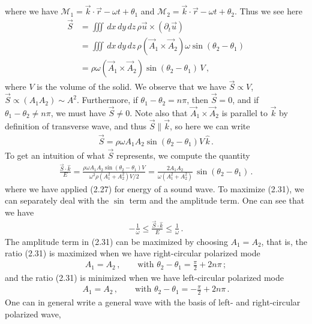 \documentclass[11pt, onesided]{book}
\theoremstyle{break}
\theoremstyle{break}
\newcommand{\pd}{\partial}
\begin{document}
where we have $\mathcal{M}_1 = \vec{k}\cdot \vec{r} - \omega t + \theta_1$ and $\mathcal{M}_2 = \vec{k}\cdot \vec{r} - \omega t + \theta_2$. Thus we see here
\begin{align*}
\vec{S} 
&= \iiint \, dx\,dy\,dz \, \rho \vec{u}\times (\pd_t \vec{u})\\
&= \iiint \, dx\,dy\,dz \, \rho (\vec{A}_1 \times \vec{A}_2) \omega \sin(\theta_2- \theta_1) \\
&= \rho \omega (\vec{A}_1 \times \vec{A}_2) \sin(\theta_2 - \theta_1) \, V\,,
\end{align*}
where $V$ is the volume of the solid. We observe that we have $\vec{S} \propto V$, $\vec{S}\propto (A_1 A_2) \sim A^2$. Furthermore, if $\theta_1 - \theta_2 = n\pi$, then $\vec{S} = 0$, and if $\theta_1 - \theta_2 \neq n\pi$, we must have $\vec{S} \neq 0$. Note also that $\vec{A}_1 \times \vec{A}_2$ is parallel to $\vec{k}$ by definition of transverse wave, and thus $\vec{S}\parallel \vec{k}$, so here we can write
\begin{align*}
\vec{S} = \rho \omega A_1 A_2 \sin(\theta_2 - \theta_1) V\, \hat{k}\,.
\end{align*}
To get an intuition of what $\vec{S}$ represents, we compute the quantity
\begin{align}
\frac{\vec{S} \cdot \hat{k}}{E} = \frac{\rho \omega A_1A_2\sin(\theta_2 - \theta_1) V}{ \omega^2 \rho (A_1^2 + A_2^2)V/2} = \frac{2A_1A_2}{\omega(A_1^2 + A_2^2)}\, \sin(\theta_2 - \theta_1)\,.
\end{align}
where we have applied (2.27) for energy of a sound wave. To maximize (2.31), we can separately deal with the $\sin$ term and the amplitude term. One can see that we have
\begin{align*}
-\frac{1}{\omega} \leq \frac{\vec{S} \cdot \hat{k}}{E}  \leq \frac{1}{\omega}\,.
\end{align*}
The amplitude term in (2.31) can be maximized by choosing $A_1 = A_2$, that is, the ratio (2.31) is maximized when we have right-circular polarized mode
\begin{align*}
A_1 = A_2 \,,\qquad\text{with }\theta_2 - \theta_1 = \frac{\pi}{2} + 2n\pi\,;
\end{align*}
and the ratio (2.31) is minimized when we have left-circular polarized mode
\begin{align*}
A_1 = A_2 \,,\qquad\text{with }\theta_2 - \theta_1 =- \frac{\pi}{2} + 2n\pi\,.
\end{align*}
One can in general write a general wave with the basis of left- and right-circular polarized wave,
\end{document}
